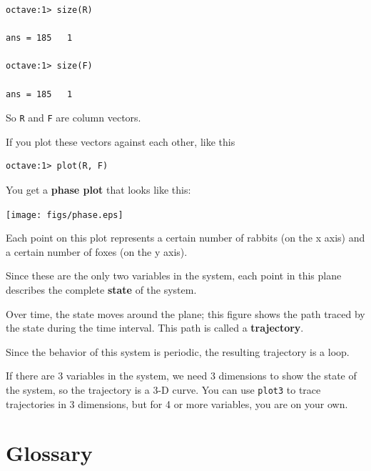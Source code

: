 \documentclass{book}
\begin{document}
\begin{verbatim}
octave:1> size(R)

ans = 185   1

octave:1> size(F)

ans = 185   1
\end{verbatim}

So {\tt R} and {\tt F} are column vectors. 


If you plot these
vectors against each other, like this

\begin{verbatim}
octave:1> plot(R, F)
\end{verbatim}

You get a {\bf phase plot} that looks like this:

\beforefig \centerline{\texttt{[image: figs/phase.eps]}}

Each point on this plot represents a certain number of rabbits (on the
x axis) and a certain number of foxes (on the y axis).

Since these are the only two variables in the system, each point in
this plane describes the complete {\bf state} of the system.

Over time, the state moves around the plane; this figure shows
the path traced by the state during the time interval. This path
is called a {\bf trajectory}.

Since the behavior of this system is periodic, the resulting
trajectory is a loop.

If there are 3 variables in the system, we need 3 dimensions to show
the state of the system, so the trajectory is a 3-D curve.
You can use {\tt plot3} to trace trajectories in 3 dimensions,
but for 4 or more variables, you are on your own.


\section{Glossary}
\end{document}
